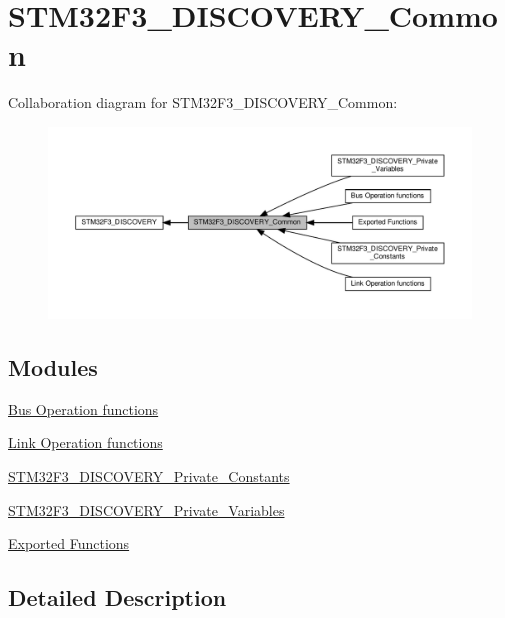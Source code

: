 \hypertarget{group__STM32F3__DISCOVERY__Common}{}\section{S\+T\+M32\+F3\+\_\+\+D\+I\+S\+C\+O\+V\+E\+R\+Y\+\_\+\+Common}
\label{group__STM32F3__DISCOVERY__Common}
Collaboration diagram for S\+T\+M32\+F3\+\_\+\+D\+I\+S\+C\+O\+V\+E\+R\+Y\+\_\+\+Common\+:\nopagebreak
\begin{figure}[H]
\begin{center}
\leavevmode
\includegraphics[width=350pt]{group__STM32F3__DISCOVERY__Common}
\end{center}
\end{figure}
\subsection*{Modules}
\begin{DoxyCompactItemize}
\item 
\hyperlink{group__STM32F3__DISCOVERY__BUS}{Bus Operation functions}
\item 
\hyperlink{group__STM32F3__DISCOVERY__LINK__OPERATIONS}{Link Operation functions}
\item 
\hyperlink{group__STM32F3__DISCOVERY__Private__Constants}{S\+T\+M32\+F3\+\_\+\+D\+I\+S\+C\+O\+V\+E\+R\+Y\+\_\+\+Private\+\_\+\+Constants}
\item 
\hyperlink{group__STM32F3__DISCOVERY__Private__Variables}{S\+T\+M32\+F3\+\_\+\+D\+I\+S\+C\+O\+V\+E\+R\+Y\+\_\+\+Private\+\_\+\+Variables}
\item 
\hyperlink{group__STM32F3__DISCOVERY__Exported__Functions}{Exported Functions}
\end{DoxyCompactItemize}


\subsection{Detailed Description}
